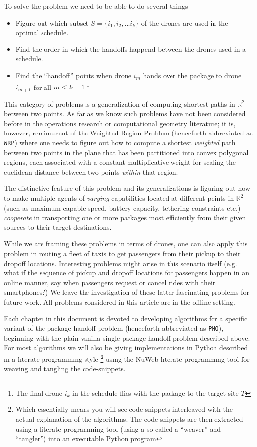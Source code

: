 \documentclass[12.0pt]{report}
\begin{document}
To solve the problem we need to be able to do several things

\begin{itemize}
\item Figure out which subset $S = \{i_1, i_2, \ldots i_k\}$ of the drones are used in the optimal schedule. 
\item Find the order in which the handoffs happend between the drones used in a schedule. 
\item Find the ``handoff'' points when drone $i_m$ hands over the package to drone $i_{m+1}$ for all $m \leq k-1$ 
      \footnote{The final drone $i_k$ in the schedule flies with the package to the target site $T$}
\end{itemize}

This category of problems is a generalization of computing shortest paths in $\mathbb{R}^2$ 
between 
two points. As far as we know such problems have not been considered before in the 
operations research or computational geometry literature; it is, however, reminescent of 
the Weighted Region Problem \cite{mitchell1991weighted} (henceforth abbreviated as 
\texttt{WRP}) where one needs to figure out how to compute a 
shortest \textit{weighted} path between two points in the plane
that has been partitioned into convex polygonal regions, each associated with a constant 
multiplicative weight for scaling the euclidean distance between two points 
\textit{within} that region.  


The distinctive feature of this problem and its generalizations is figuring out how 
to make multiple agents of \textit{varying} capabilities  located at different points 
in $\mathbb{R}^2$ (such as maximum capable speed, battery capacity, tethering constraints 
etc.) \textit{cooperate} in transporting one or more packages most efficiently 
from their given sources to their target destinations. 

While we are framing these problems in terms of drones, one can also apply this problem 
in routing a fleet of taxis to get passengers from their pickup to their dropoff locations. 
Interesting problems might arise in this scenario itself (e.g. what if the sequence of 
pickup and dropoff locations for passengers happen in an online manner, say when passengers request or cancel rides with their 
smartphones?) We leave the investigation of these latter fascinating problems for future work. 
All problems considered in this article are in the offline setting. 


Each chapter in this document is devoted to developing algorithms for a specific 
variant of the package handoff problem (henceforth abbreviated as \texttt{PHO}), beginning 
with the plain-vanilla single package handoff problem described above. 
For most algorithms we will also be giving implementations in Python described in a 
literate-programming style \footnote{Which essentially means you will see code-snippets interleaved with the actual explanation of the algorithms. 
The code snippets are then extracted using a literate programming tool (using a so-called a ``weaver'' and ``tangler'') into an 
executable Python program} \cite{knuth1984literate} using the NuWeb literate programming tool \cite{briggs2001nuweb}  
for weaving and tangling the code-snippets. 
\end{document}

